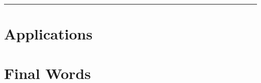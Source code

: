 \documentclass[]{book}
\begin{document}
\begin{center}\rule{0.5\linewidth}{\linethickness}\end{center}

\chapter{Applications}\label{applications}

\chapter{Final Words}\label{final-words}


\end{document}
